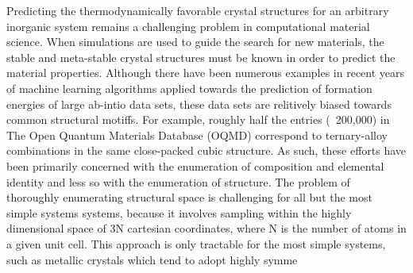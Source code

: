 

Predicting the thermodynamically favorable crystal structures for an arbitrary inorganic system remains a challenging problem in computational material science.
%
%
When simulations are used to guide the search for new materials, the stable and meta-stable crystal structures must be known in order to predict the material properties.
Although there have been numerous examples in recent years of machine learning algorithms applied towards the prediction of formation energies of large ab-intio data sets, these data sets are relitively biased towards common structural motiffs.
%
For example, roughly half the entries (~200,000) in The Open Quantum Materials Database (OQMD) correspond to ternary-alloy combinations in the same close-packed cubic structure.
As such, these efforts have been primarily concerned with the enumeration of composition and elemental identity and less so with the enumeration of structure.
%
The problem of thoroughly enumerating structural space is challenging for all but the most simple systems systems, because it involves sampling within the highly dimensional space of 3N cartesian coordinates, where N is the number of atoms in a given unit cell.
This approach is only tractable for the most simple systems,
such as metallic crystals which tend to adopt highly symme

